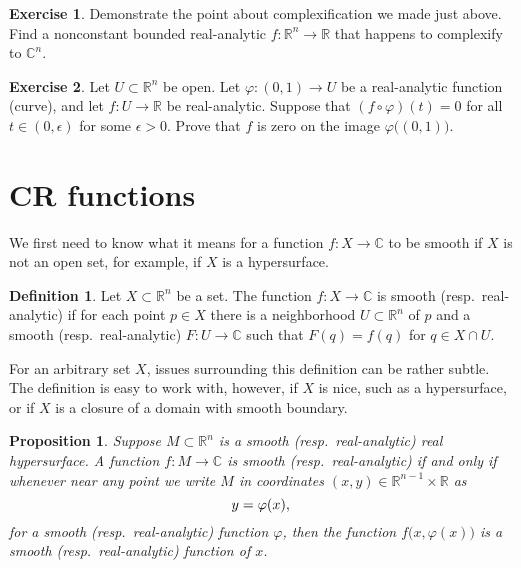 \documentclass[12pt,openany]{book}
\newcommand{\avoidbreak}{\postdisplaypenalty=100}
\newcommand{\C}{{\mathbb{C}}}
\newcommand{\R}{{\mathbb{R}}}
\theoremstyle{plain}
\newtheorem{prop}[thm]{Proposition}
\theoremstyle{remark}
\theoremstyle{definition}
\newtheorem{defn}[thm]{Definition}
\newenvironment{exbox}{%
    \def\FrameCommand{\vrule width 1pt \relax\hspace{10pt}}%
    \MakeFramed{\advance\hsize-\width\FrameRestore}%
}{%
    \endMakeFramed
}
\theoremstyle{exercise}
\newtheorem{exercise}{Exercise}[section]
\theoremstyle{example}
\begin{document}
\begin{exbox}
\begin{exercise}
Demonstrate the point about complexification we made just above.
Find a nonconstant bounded real-analytic $f \colon \R^n \to \R$
that happens to complexify to $\C^n$.
\end{exercise}

\begin{exercise}
Let $U \subset \R^n$ be open.  Let $\varphi \colon (0,1) \to U$ be a
real-analytic function (curve), and let $f \colon U \to \R$ be
real-analytic.  Suppose that $(f \circ \varphi)(t) = 0$ for all $t \in
(0,\epsilon)$ for some $\epsilon > 0$.  Prove that $f$ is zero on the
image $\varphi\bigl((0,1)\bigr)$.
\end{exercise}
\end{exbox}


\section{CR functions}

We first need to know what it means for a function $f \colon X \to \C$
to be smooth if $X$ is not an open set, for example, if $X$ is a hypersurface.

\begin{defn}
Let $X \subset \R^n$ be a set.
The function $f \colon X \to \C$ is smooth (resp.\
real-analytic) if for each point $p \in X$ there is a
neighborhood $U \subset \R^n$ of $p$ and a smooth (resp.\ real-analytic) $F
\colon U \to \C$ such that $F(q) = f(q)$ for $q \in X \cap U$.
\end{defn}

For an arbitrary set $X$, issues surrounding this definition can be
rather subtle.  The definition
is easy to work with,
however, if $X$ is nice, such as a hypersurface, or if $X$ is
a closure of a domain with smooth boundary.

\begin{prop}
Suppose $M \subset \R^n$ is a smooth (resp.\ real-analytic) real hypersurface.
A function $f \colon M \to \C$
is smooth (resp.\ real-analytic) if and only if whenever near any point we write
$M$ in coordinates $(x,y) \in \R^{n-1} \times \R$ as
\begin{equation*}
y = \varphi(x) ,
\avoidbreak
\end{equation*}
for a smooth (resp.\ real-analytic) function $\varphi$, then
the function $f\bigl(x,\varphi(x)\bigr)$ is a smooth (resp.\ real-analytic) function of $x$.
\end{prop}
\end{document}
